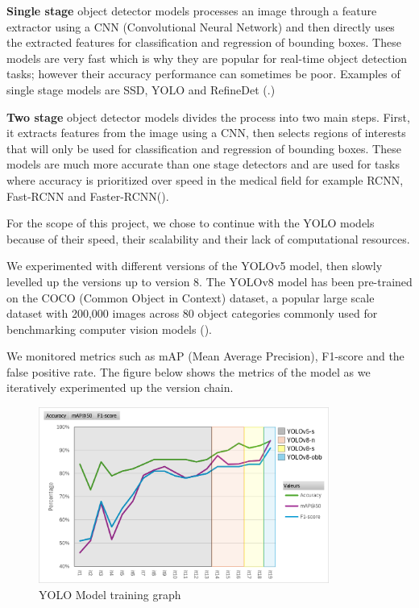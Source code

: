 \newpage{}
\textbf{Single stage} object detector models processes an image through a
feature extractor using a CNN (Convolutional Neural Network) and then directly
uses the extracted features for classification and regression of bounding boxes.
These models are very fast which is why they are popular for real-time object
detection tasks; however their accuracy performance can sometimes be poor.
Examples of single stage models are SSD, YOLO and RefineDet
(\cite{yoloversionsliterature}.)

\textbf{Two stage} object detector models divides the process into two main
steps. First, it extracts features from the image using a CNN, then selects
regions of interests that will only be used for classification and regression of
bounding boxes. These models are much more accurate than one stage detectors and
are used for tasks where accuracy is prioritized over speed in the medical field
for example RCNN, Fast-RCNN and Faster-RCNN(\cite{singlevstwostagedetectors}).

For the scope of this project, we chose to continue with the YOLO models because
of their speed, their scalability and their lack of computational resources.

We experimented with different versions of the YOLOv5 model, then slowly
levelled up the versions up to version 8.  The YOLOv8 model has been pre-trained
on the COCO (Common Object in Context) dataset, a popular large scale dataset
with 200,000 images across 80 object categories commonly used for benchmarking
computer vision models (\cite{cocodataset}).

We monitored metrics such as mAP (Mean Average Precision), F1-score and the
false positive rate. The figure below shows the metrics of the model as we
iteratively experimented up the version chain.

\begin{figure}[htbp]
  \centering
  \includegraphics[width=0.85\textwidth]{images/yolo-results.png}
  \caption{YOLO Model training graph}
\end{figure}

